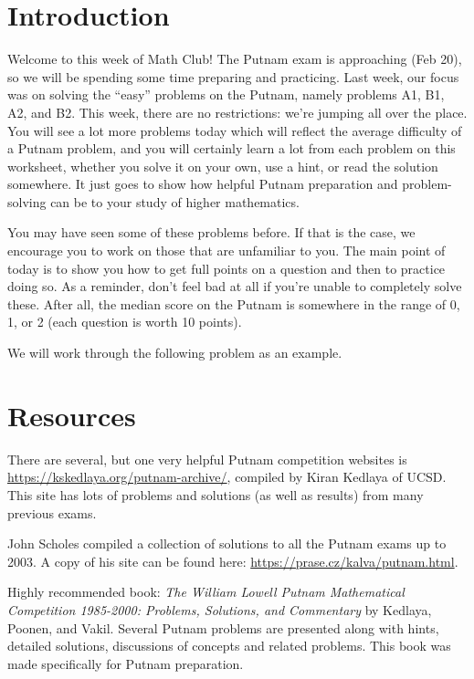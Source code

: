 \documentclass{article}
\theoremstyle{definition}
\theoremstyle{remark}
\begin{document}
\section{Introduction}

    Welcome to this week of Math Club!
    The Putnam exam is approaching (Feb 20), so we will be spending some time preparing and practicing.
    Last week, our focus was on solving the ``easy'' problems on the Putnam, namely problems A1, B1, A2, and B2. This week, there are no restrictions: we're jumping all over the place. You will see a lot more problems today which will reflect the average difficulty of a Putnam problem, and you will certainly learn a lot from each problem on this worksheet, whether you solve it on your own, use a hint, or read the solution somewhere. It just goes to show how helpful Putnam preparation and problem-solving can be to your study of higher mathematics.
    
    You may have seen some of these problems before.
    If that is the case, we encourage you to work on those that are unfamiliar to you.
    The main point of today is to show you how to get full points on a question and then to practice doing so.
    As a reminder, don't feel bad at all if you're unable to completely solve these.
    After all, the median score on the Putnam is somewhere in the range of 0, 1, or 2 (each question is worth 10 points).
    
    We will work through the following problem as an example.

\section{Resources}
    There are several, but one very helpful Putnam competition websites is \url{https://kskedlaya.org/putnam-archive/}, compiled by Kiran Kedlaya of UCSD.
    This site has lots of problems and solutions (as well as results) from many previous exams.
    
    John Scholes compiled a collection of solutions to all the Putnam exams up to 2003. A copy of his site can be found here: \url{https://prase.cz/kalva/putnam.html}. 
    
    Highly recommended book: \emph{The William Lowell Putnam Mathematical Competition 1985-2000: Problems, Solutions, and Commentary} by Kedlaya, Poonen, and Vakil. Several Putnam problems are presented along with hints, detailed solutions, discussions of concepts and related problems. This book was made specifically for Putnam preparation.
\end{document}
